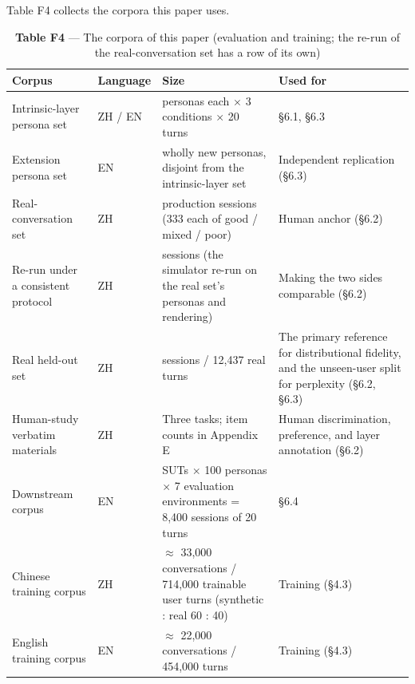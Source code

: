 \documentclass[letterpaper]{article}
\begin{document}
Table F4 collects the corpora this paper uses.


\begin{table}[t]
\centering\footnotesize
\setlength{\tabcolsep}{4pt}
\caption{\textbf{Table F4} --- The corpora of this paper (evaluation and training; the re-run of the real-conversation set has a row of its own)}
\begin{tabular}{@{}>{\raggedright\arraybackslash}p{}>{\raggedright\arraybackslash}p{}>{\raggedright\arraybackslash}p{}>{\raggedright\arraybackslash}p{}@{}}
\toprule
Corpus & Language & Size & Used for \\
\midrule
Intrinsic-layer persona set & ZH / EN & 100 personas each $\times$ 3 conditions $\times$ 20 turns & \S{}6.1, \S{}6.3 \\
Extension persona set & EN & 321 wholly new personas, disjoint from the intrinsic-layer set & Independent replication (\S{}6.3) \\
Real-conversation set & ZH & 999 production sessions (333 each of good / mixed / poor) & Human anchor (\S{}6.2) \\
Re-run under a consistent protocol & ZH & 600 sessions (the simulator re-run on the real set's personas and rendering) & Making the two sides comparable (\S{}6.2) \\
Real held-out set & ZH & 500 sessions / 12,437 real turns & The primary reference for distributional fidelity, and the unseen-user split for perplexity (\S{}6.2, \S{}6.3) \\
Human-study verbatim materials & ZH & Three tasks; item counts in Appendix E & Human discrimination, preference, and layer annotation (\S{}6.2) \\
Downstream corpus & EN & 12 SUTs $\times$ 100 personas $\times$ 7 evaluation environments = 8,400 sessions of 20 turns & \S{}6.4 \\
Chinese training corpus & ZH & $\approx$ 33,000 conversations / 714,000 trainable user turns (synthetic : real 60 : 40) & Training (\S{}4.3) \\
English training corpus & EN & $\approx$ 22,000 conversations / 454,000 turns & Training (\S{}4.3) \\
\bottomrule
\end{tabular}
\end{table}


\end{document}
